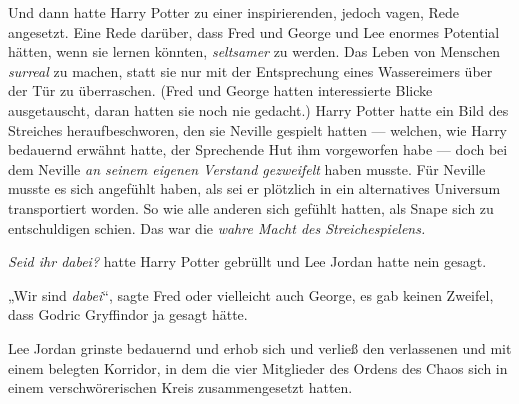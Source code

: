 Und dann hatte Harry Potter zu einer inspirierenden, jedoch vagen, Rede angesetzt. Eine Rede darüber, dass Fred und George und Lee enormes Potential hätten, wenn sie lernen könnten, \emph{seltsamer} zu werden. Das Leben von Menschen \emph{surreal} zu machen, statt sie nur mit der Entsprechung eines Wassereimers über der Tür zu überraschen. (Fred und George hatten interessierte Blicke ausgetauscht, daran hatten sie noch nie gedacht.) Harry Potter hatte ein Bild des Streiches heraufbeschworen, den sie Neville gespielt hatten — welchen, wie Harry bedauernd erwähnt hatte, der Sprechende Hut ihm vorgeworfen habe — doch bei dem Neville \emph{an seinem eigenen Verstand gezweifelt} haben musste. Für Neville musste es sich angefühlt haben, als sei er plötzlich in ein alternatives Universum transportiert worden. So wie alle anderen sich gefühlt hatten, als Snape sich zu entschuldigen schien. Das war die \emph{wahre Macht des Streichespielens.}

\emph{Seid ihr dabei?} hatte Harry Potter gebrüllt und Lee Jordan hatte nein gesagt.

„Wir sind \emph{dabei}“, sagte Fred oder vielleicht auch George, es gab keinen Zweifel, dass Godric Gryffindor ja gesagt hätte.

Lee Jordan grinste bedauernd und erhob sich und verließ den verlassenen und mit einem  belegten Korridor, in dem die vier Mitglieder des Ordens des Chaos sich in einem verschwörerischen Kreis zusammengesetzt hatten.

